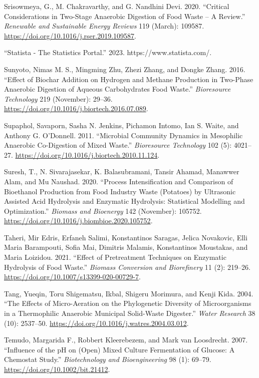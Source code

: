 \documentclass[11pt]{report}
\begin{document}
\begin{hangparas}{1.5em}{1}
\hypertarget{citeproc_bib_item_61}{Srisowmeya, G., M. Chakravarthy, and G. Nandhini Devi. 2020. “Critical Considerations in Two-Stage Anaerobic Digestion of Food Waste – A Review.” \textit{Renewable and Sustainable Energy Reviews} 119 (March): 109587. \url{https://doi.org/10.1016/j.rser.2019.109587}.}

\hypertarget{citeproc_bib_item_62}{“Statista - The Statistics Portal.” 2023. https://www.statista.com/.}

\hypertarget{citeproc_bib_item_63}{Sunyoto, Nimas M. S., Mingming Zhu, Zhezi Zhang, and Dongke Zhang. 2016. “Effect of Biochar Addition on Hydrogen and Methane Production in Two-Phase Anaerobic Digestion of Aqueous Carbohydrates Food Waste.” \textit{Bioresource Technology} 219 (November): 29–36. \url{https://doi.org/10.1016/j.biortech.2016.07.089}.}

\hypertarget{citeproc_bib_item_64}{Supaphol, Savaporn, Sasha N. Jenkins, Pichamon Intomo, Ian S. Waite, and Anthony G. O’Donnell. 2011. “Microbial Community Dynamics in Mesophilic Anaerobic Co-Digestion of Mixed Waste.” \textit{Bioresource Technology} 102 (5): 4021–27. \url{https://doi.org/10.1016/j.biortech.2010.11.124}.}

\hypertarget{citeproc_bib_item_65}{Suresh, T., N. Sivarajasekar, K. Balasubramani, Tansir Ahamad, Manawwer Alam, and Mu Naushad. 2020. “Process Intensification and Comparison of Bioethanol Production from Food Industry Waste (Potatoes) by Ultrasonic Assisted Acid Hydrolysis and Enzymatic Hydrolysis: Statistical Modelling and Optimization.” \textit{Biomass and Bioenergy} 142 (November): 105752. \url{https://doi.org/10.1016/j.biombioe.2020.105752}.}

\hypertarget{citeproc_bib_item_66}{Taheri, Mir Edris, Erfaneh Salimi, Konstantinos Saragas, Jelica Novakovic, Elli Maria Barampouti, Sofia Mai, Dimitris Malamis, Konstantinos Moustakas, and Maria Loizidou. 2021. “Effect of Pretreatment Techniques on Enzymatic Hydrolysis of Food Waste.” \textit{Biomass Conversion and Biorefinery} 11 (2): 219–26. \url{https://doi.org/10.1007/s13399-020-00729-7}.}

\hypertarget{citeproc_bib_item_67}{Tang, Yueqin, Toru Shigematsu, Ikbal, Shigeru Morimura, and Kenji Kida. 2004. “The Effects of Micro-Aeration on the Phylogenetic Diversity of Microorganisms in a Thermophilic Anaerobic Municipal Solid-Waste Digester.” \textit{Water Research} 38 (10): 2537–50. \url{https://doi.org/10.1016/j.watres.2004.03.012}.}

\hypertarget{citeproc_bib_item_68}{Temudo, Margarida F., Robbert Kleerebezem, and Mark van Loosdrecht. 2007. “Influence of the pH on (Open) Mixed Culture Fermentation of Glucose: A Chemostat Study.” \textit{Biotechnology and Bioengineering} 98 (1): 69–79. \url{https://doi.org/10.1002/bit.21412}.}


\end{hangparas}
\end{document}
